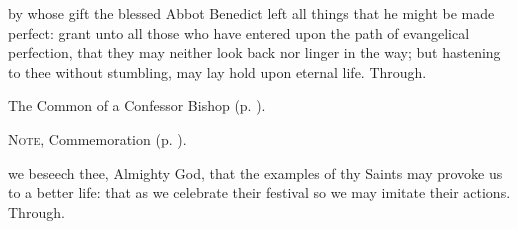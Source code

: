 \clearpage
{}

\memorialCollect
{} by whose gift the blessed Abbot Benedict left all things that he might be made perfect: grant unto all those who have entered upon the path of evangelical perfection, that they may neither look back nor linger in the way; but hastening to thee without stumbling, may lay hold upon eternal life. Through.



\begin{rubric}
	The Common of a Confessor Bishop (p. \pageref{CommonConfessorBishop}).
\end{rubric}

\begin{rubric}
	\textsc{Note,} Commemoration  (p. \pageref{FelixCollect}).
\end{rubric}




\memorialCollect\label{FelixCollect}
 we beseech thee, Almighty God, that the examples of thy Saints may provoke us to a better life: that as we celebrate their festival so we may imitate their actions. Through.



